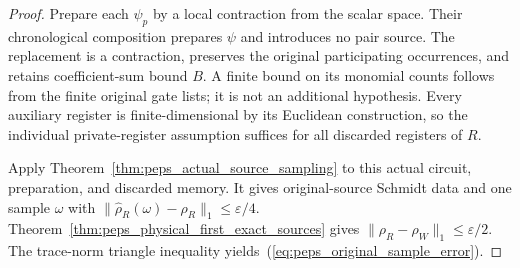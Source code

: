 \begin{proof}\leanok
    Prepare each $\psi_p$ by a local contraction from the scalar space.
    Their chronological composition prepares $\psi$ and introduces no
    pair source. The replacement is a contraction, preserves the original
    participating occurrences, and retains coefficient-sum bound $B$.
    A finite bound on its monomial counts follows from the finite original
    gate lists; it is not an additional hypothesis. Every auxiliary
    register is finite-dimensional by its Euclidean construction, so the
    individual private-register assumption suffices for all discarded
    registers of $R$.

    Apply Theorem~\ref{thm:peps_actual_source_sampling} to this actual
    circuit, preparation, and discarded memory. It gives original-source
    Schmidt data and one sample $\omega$ with
    $\|\widehat\rho_R(\omega)-\rho_R\|_1\le\varepsilon/4$.
    Theorem~\ref{thm:peps_physical_first_exact_sources} gives
    $\|\rho_R-\rho_W\|_1\le\varepsilon/2$. The trace-norm triangle
    inequality yields~(\ref{eq:peps_original_sample_error}).
\end{proof}

